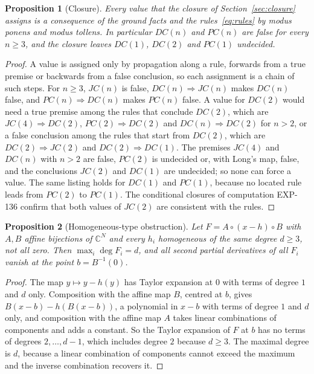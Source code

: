 \documentclass[11pt]{article}
\newtheorem{proposition}{Proposition}
\theoremstyle{remark}
\newcommand{\C}{\mathbb{C}}
\newcommand{\EXP}[1]{\mbox{EXP-#1}}
\begin{document}
\begin{proposition}[Closure]\label{prop:closure}
Every value that the closure of Section~\ref{sec:closure} assigns is a consequence of the ground facts and the rules~\eqref{eq:rules} by modus ponens and modus tollens. In particular $DC(n)$ and $PC(n)$ are false for every $n\ge3$, and the closure leaves $DC(1)$, $DC(2)$ and $PC(1)$ undecided.
\end{proposition}
\begin{proof}
A value is assigned only by propagation along a rule, forwards from a true premise or backwards from a false conclusion, so each assignment is a chain of such steps. For $n\ge3$, $JC(n)$ is false, $DC(n)\Rightarrow JC(n)$ makes $DC(n)$ false, and $PC(n)\Rightarrow DC(n)$ makes $PC(n)$ false. A value for $DC(2)$ would need a true premise among the rules that conclude $DC(2)$, which are $JC(4)\Rightarrow DC(2)$, $PC(2)\Rightarrow DC(2)$ and $DC(n)\Rightarrow DC(2)$ for $n>2$, or a false conclusion among the rules that start from $DC(2)$, which are $DC(2)\Rightarrow JC(2)$ and $DC(2)\Rightarrow DC(1)$. The premises $JC(4)$ and $DC(n)$ with $n>2$ are false, $PC(2)$ is undecided or, with Long's map, false, and the conclusions $JC(2)$ and $DC(1)$ are undecided; so none can force a value. The same listing holds for $DC(1)$ and $PC(1)$, because no located rule leads from $PC(2)$ to $PC(1)$. The conditional closures of computation \EXP{136} confirm that both values of $JC(2)$ are consistent with the rules. \qedhere
\end{proof}

\begin{proposition}[Homogeneous-type obstruction]\label{prop:homtype}
Let $F=A\circ(x-h)\circ B$ with $A,B$ affine bijections of $\C^N$ and every $h_i$ homogeneous of the same degree $d\ge3$, not all zero. Then $\max_i\deg F_i=d$, and all second partial derivatives of all $F_i$ vanish at the point $b=B^{-1}(0)$.
\end{proposition}
\begin{proof}
The map $y\mapsto y-h(y)$ has Taylor expansion at $0$ with terms of degree $1$ and $d$ only. Composition with the affine map $B$, centred at $b$, gives $B(x-b)-h(B(x-b))$, a polynomial in $x-b$ with terms of degree $1$ and $d$ only, and composition with the affine map $A$ takes linear combinations of components and adds a constant. So the Taylor expansion of $F$ at $b$ has no terms of degrees $2,\dots,d-1$, which includes degree $2$ because $d\ge3$. The maximal degree is $d$, because a linear combination of components cannot exceed the maximum and the inverse combination recovers it. \qedhere
\end{proof}
\end{document}
